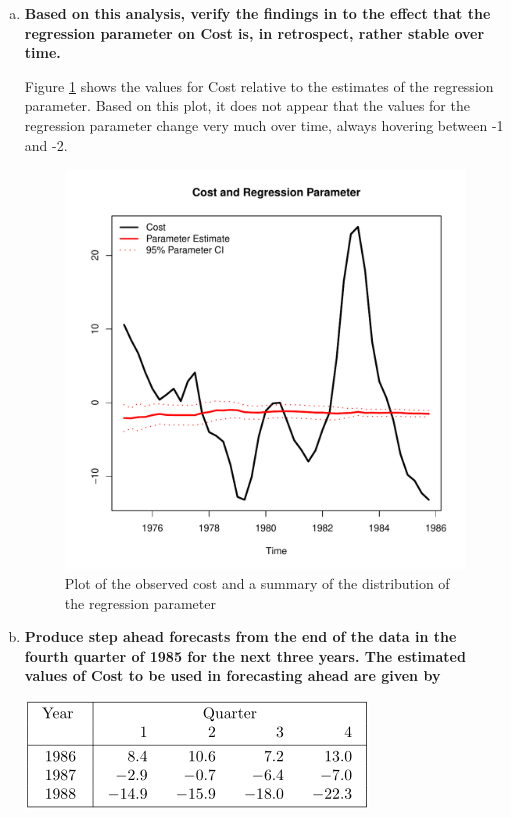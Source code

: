 \documentclass{article}
\begin{document}
\begin{enumerate}[(a)]
		\item \textbf{Based on this analysis, verify the findings in \cite{WHP1987b} to the effect that the regression parameter on Cost is, in retrospect, rather stable over time.}
		
		Figure \ref{fig:costandregressionparm} shows the values for Cost relative to the estimates of the regression parameter. Based on this plot, it does not appear that the values for the regression parameter change very much over time, always hovering between -1 and -2.
		
		\begin{figure}
			\centering
			\includegraphics[width=0.7\linewidth]{CostandRegressionParm}
			\caption{Plot of the observed cost and a summary of the distribution of the regression parameter}
			\label{fig:costandregressionparm}
		\end{figure}
		
		\item \textbf{Produce step ahead forecasts from the end of the data in the fourth quarter of 1985 for the next three years. The estimated values of Cost to be used in forecasting ahead are given by}
		\begin{center}
			\includegraphics[width=0.5\linewidth]{CostFuture}
		\end{center}
		
	\end{enumerate}
	


	
\end{document}
